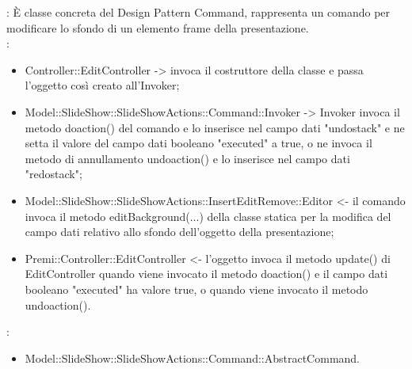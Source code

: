 {{				\textbf{\tipo}: È classe concreta del Design Pattern Command, rappresenta un comando per modificare lo sfondo di un elemento frame della presentazione.\\	
				\textbf{\relaz}: 
				\begin{itemize}
					\item Controller::\-EditController -> invoca il costruttore della classe e passa l’oggetto così creato all’Invoker;
					\item Model::\-SlideShow::\-SlideShowActions::\-Command::\-Invoker -> Invoker invoca il metodo doaction() del comando e lo inserisce nel campo dati "undostack" e ne setta il valore del campo dati booleano "executed" a true, o ne invoca il metodo di annullamento undoaction() e lo inserisce nel campo dati "redostack";
                    \item Model::\-SlideShow::\-SlideShowActions::\-InsertEditRemove::\-Editor <- il comando invoca il metodo editBackground(...) della classe statica per la modifica del campo dati relativo allo sfondo dell'oggetto della presentazione;
                    \item Premi::\-Controller::\-EditController <- l'oggetto invoca il metodo update() di EditController quando viene invocato il metodo doaction() e il campo dati booleano "executed" ha valore true, o quando viene invocato il metodo undoaction().
				\end{itemize}	
                \textbf{\base}: 
                    \begin{itemize}
                    \item Model::\-SlideShow::\-SlideShowActions::\-Command::\-AbstractCommand.
                    \end{itemize}
                    }
                     }

